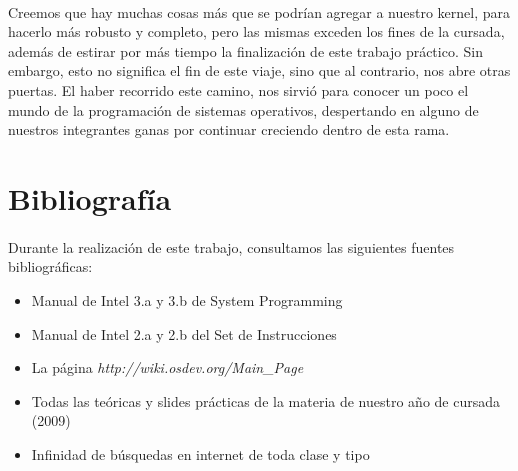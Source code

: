 \documentclass[11pt, a4paper]{article}
\begin{document}
	\paragraph{}
	Creemos que hay muchas cosas más que se podrían agregar a nuestro kernel, para hacerlo más robusto y completo, pero las mismas exceden los fines de la cursada, además de estirar por más tiempo la finalización de este trabajo práctico. Sin embargo, esto no significa el fin de este viaje, sino que al contrario, nos abre otras puertas. El haber recorrido este camino, nos sirvió para conocer un poco el mundo de la programación de sistemas operativos, despertando en alguno de nuestros integrantes ganas por continuar creciendo dentro de esta rama.



\section{Bibliografía}

\paragraph{}
Durante la realización de este trabajo, consultamos las siguientes fuentes bibliográficas:

\begin{itemize}
	\item Manual de Intel 3.a y 3.b de System Programming
	\item Manual de Intel 2.a y 2.b del Set de Instrucciones
	\item La página \textit{http://wiki.osdev.org/Main\_Page}
	\item Todas las teóricas y slides prácticas de la materia de nuestro año de cursada (2009)
	\item Infinidad de búsquedas en internet de toda clase y tipo
\end{itemize}
\end{document}
